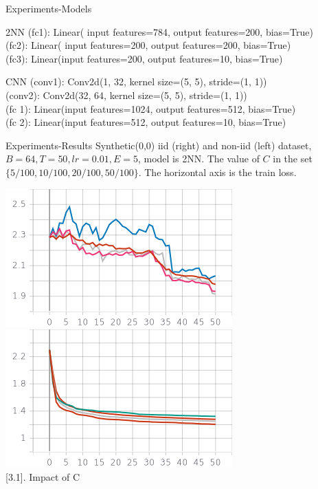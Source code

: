 \documentclass{beamer}
\begin{document}
\begin{frame}{Experiments-Models}
	\begin{block}{2NN}
	(fc1): Linear( input features=784, output features=200, bias=True)\\
	(fc2): Linear( input features=200, output features=200, bias=True)\\
	(fc3): Linear(input features=200, output features=10, bias=True)
	\end{block}
\begin{block}{CNN}
	(conv1): Conv2d(1, 32, kernel size=(5, 5), stride=(1, 1)) \\
	(conv2): Conv2d(32, 64, kernel size=(5, 5), stride=(1, 1))\\
	(fc 1): Linear(input features=1024, output features=512, bias=True)\\
	(fc 2): Linear(input features=512, output features=10, bias=True)
	\end{block}
\end{frame}
\begin{frame}{Experiments-Results}
 Synthetic(0,0) iid (right) and non-iid (left) dataset, $ B=64, T=50,lr=0.01,E=5$, model is 2NN. The value of $C$ in the set $\{5/100,10/100,20/100,50/100\}$. The horizontal axis is the train loss.
\begin{center}
	\includegraphics[scale=0.5]{Cniid.png}
	\includegraphics[scale=0.5]{Ciid.png} \\
	\figurename[3.1]{. Impact of C}
\end{center}
\end{frame}
\end{document}
